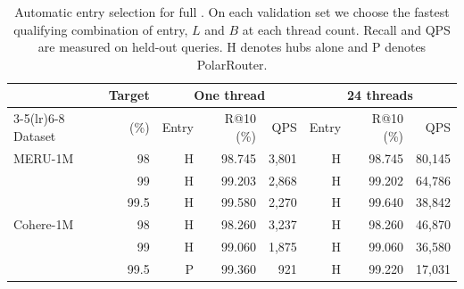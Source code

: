 \begin{table}[t]
\centering
\caption{Automatic entry selection for full \rquiver{}. On each validation set we choose the fastest qualifying combination of entry, $L$ and $B$ at each thread count. Recall and QPS are measured on held-out queries. H denotes hubs alone and P denotes PolarRouter.}
\label{tab:auto_entry}
\footnotesize
\setlength{\tabcolsep}{2.5pt}
\begin{tabular}{@{}lrrrrrrr@{}}
\toprule
& Target & \multicolumn{3}{c}{One thread} & \multicolumn{3}{c}{24 threads}\\
\cmidrule(lr){3-5}\cmidrule(lr){6-8}
Dataset & (\%) & Entry & R@10 (\%) & QPS & Entry & R@10 (\%) & QPS\\
\midrule
MERU-1M & 98 & H & 98.745 & 3,801 & H & 98.745 & 80,145 \\
 & 99 & H & 99.203 & 2,868 & H & 99.202 & 64,786 \\
 & 99.5 & H & 99.580 & 2,270 & H & 99.640 & 38,842 \\
Cohere-1M & 98 & H & 98.260 & 3,237 & H & 98.260 & 46,870 \\
 & 99 & H & 99.060 & 1,875 & H & 99.060 & 36,580 \\
 & 99.5 & P & 99.360 & 921 & H & 99.220 & 17,031 \\
\bottomrule
\end{tabular}
\end{table}
